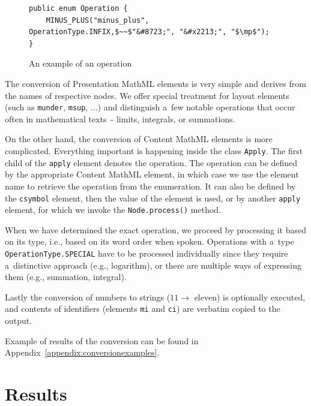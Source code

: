 \documentclass[11pt,oneside,final]{fithesis2}
\begin{document}
\begin{figure}[!ht]
\begin{lstlisting}[mathescape=true]
public enum Operation {
	MINUS_PLUS("minus_plus", OperationType.INFIX,$~~$"&#8723;", "&#x2213;", "$\mp$");
}
\end{lstlisting}
\caption{An example of an operation}
\label{fig:converter-operation}
\end{figure}

The conversion of Presentation MathML elements is very simple and derives from the names of respective nodes. We offer special treatment for layout elements (such as \texttt{munder}, \texttt{msup}, $\ldots$) and distinguish a~few notable operations that occur often in mathematical texts~- limits, integrals, or summations. 

On the other hand, the conversion of Content MathML elements is more complicated. Everything important is happening inside the class \texttt{Apply}. The first child of the \texttt{apply} element denotes the operation. The operation can be defined by the appropriate Content MathML element, in which case we use the element name to retrieve the operation from the enumeration. It can also be defined by the \texttt{csymbol} element, then the value of the element is used, or by another \texttt{apply} element, for which we invoke the \texttt{Node.process()} method. 

When we have determined the exact operation, we proceed by processing it based on its type, i.e., based on its word order when spoken. Operations with a~type \texttt{OperationType.SPECIAL} have to be processed individually since they require a~distinctive approach (e.g., logarithm), or there are multiple ways of expressing them (e.g., summation, integral).

Lastly the conversion of numbers to strings ($11 \rightarrow$ eleven) is optionally executed, and contents of identifiers (elements \texttt{mi} and \texttt{ci}) are verbatim copied to the output. 

Example of results of the conversion can be found in Appendix~\ref{appendix:conversionexamples}.

\chapter{Results}
\label{chapter:results}
\end{document}
